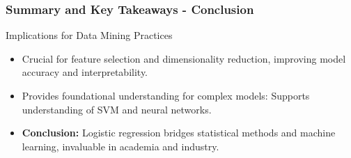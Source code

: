 \documentclass[aspectratio=169]{beamer}
\begin{document}
\begin{frame}[fragile]
    \frametitle{Summary and Key Takeaways - Conclusion}
    \begin{block}{Implications for Data Mining Practices}
        \begin{itemize}
            \item Crucial for feature selection and dimensionality reduction, improving model accuracy and interpretability.
            \item Provides foundational understanding for complex models: Supports understanding of SVM and neural networks.
            \item \textbf{Conclusion:} Logistic regression bridges statistical methods and machine learning, invaluable in academia and industry.
        \end{itemize}
    \end{block}
\end{frame}
\end{document}
